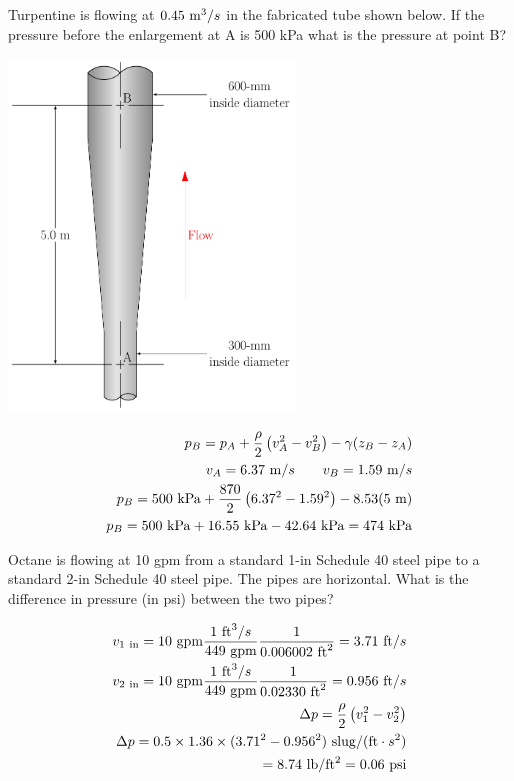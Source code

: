 \documentclass[multi,preview,varwidth=false,border=5,12pt]{standalone}
\begin{document}
\begin{question}

Turpentine is flowing at $0.45~\mathrm{m}^3/s$ in the fabricated tube shown below.  If the pressure before the enlargement at A is 500 kPa what is the pressure at point B?

\includegraphics[width=3in]{imgs/PipeExp1.pdf}


\begin{solution}
\begin{align*}
p_B=p_A+\frac{\rho}{2}\left(v_A^2-v_B^2\right)-\gamma (z_B-z_A)\\
v_A=6.37~\mathrm{m}/s\qquad v_B=1.59~\mathrm{m}/s\\
p_B=500~\mathrm{kPa}+\frac{870}{2}\left(6.37^2-1.59^2\right)-8.53 (5~\mathrm{m})\\
p_B=500~\mathrm{kPa}+16.55~\mathrm{kPa}-42.64~\mathrm{kPa}=474~\mathrm{kPa}
\end{align*}
\end{solution}

\end{question}


\begin{question}

Octane is flowing at 10 gpm from a standard 1-in Schedule 40 steel pipe to a standard 2-in Schedule 40 steel pipe.  The pipes are horizontal.  What is the difference in pressure (in psi) between the two pipes?

\begin{solution}
\begin{align*}
v_{1~\mathrm{in}}=10~\mathrm{gpm} \frac{1~\mathrm{ft}^3/s}{449~\mathrm{gpm}}\frac{1}{0.006002~\mathrm{ft}^2}=3.71~\mathrm{ft}/s\\
v_{2~\mathrm{in}}=10~\mathrm{gpm} \frac{1~\mathrm{ft}^3/s}{449~\mathrm{gpm}}\frac{1}{0.02330~\mathrm{ft}^2}=0.956~\mathrm{ft}/s\\
\Delta p = \frac{\rho}{2}\left(v_1^2-v_2^2\right)\\
\Delta p = 0.5\times 1.36\times (3.71^2-0.956^2)~\mathrm{slug}/(\mathrm{ft}\cdot s^2)\\
=8.74~\mathrm{lb}/\mathrm{ft}^2=0.06~\mathrm{psi}
\end{align*}
\end{solution}

\end{question}
\end{document}
